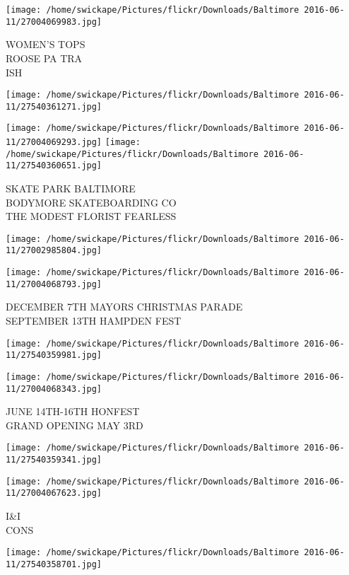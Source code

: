 \documentclass[10pt,letterpaper]{article}
\begin{document}
\texttt{[image: /home/swickape/Pictures/flickr/Downloads/Baltimore 2016-06-11/27004069983.jpg]}

WOMEN'S TOPS\\
ROOSE PA TRA\\
ISH
\pagebreak

\texttt{[image: /home/swickape/Pictures/flickr/Downloads/Baltimore 2016-06-11/27540361271.jpg]}

\vspace{0.25in}
\texttt{[image: /home/swickape/Pictures/flickr/Downloads/Baltimore 2016-06-11/27004069293.jpg]}
\texttt{[image: /home/swickape/Pictures/flickr/Downloads/Baltimore 2016-06-11/27540360651.jpg]}

SKATE PARK BALTIMORE\\
BODYMORE SKATEBOARDING CO\\
THE MODEST FLORIST FEARLESS
\pagebreak

\texttt{[image: /home/swickape/Pictures/flickr/Downloads/Baltimore 2016-06-11/27002985804.jpg]}

\vspace{0.25in}
\texttt{[image: /home/swickape/Pictures/flickr/Downloads/Baltimore 2016-06-11/27004068793.jpg]}

DECEMBER 7TH MAYORS CHRISTMAS PARADE\\
SEPTEMBER 13TH HAMPDEN FEST
\pagebreak

\texttt{[image: /home/swickape/Pictures/flickr/Downloads/Baltimore 2016-06-11/27540359981.jpg]}

\vspace{0.25in}
\texttt{[image: /home/swickape/Pictures/flickr/Downloads/Baltimore 2016-06-11/27004068343.jpg]}

JUNE 14TH{-}16TH HONFEST\\
GRAND OPENING MAY 3RD
\pagebreak

\texttt{[image: /home/swickape/Pictures/flickr/Downloads/Baltimore 2016-06-11/27540359341.jpg]}

\vspace{0.25in}
\texttt{[image: /home/swickape/Pictures/flickr/Downloads/Baltimore 2016-06-11/27004067623.jpg]}

I\&I\\
CONS
\pagebreak

\texttt{[image: /home/swickape/Pictures/flickr/Downloads/Baltimore 2016-06-11/27540358701.jpg]}
\end{document}
